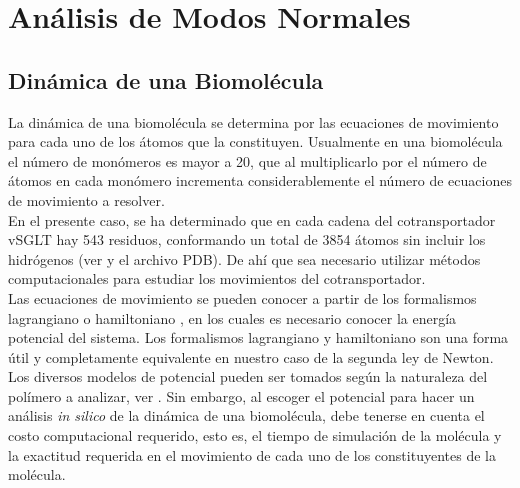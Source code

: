 \chapter{An\'{a}lisis de Modos Normales}\label{ch:Nor}

\section{Din\'{a}mica de una Biomol\'{e}cula}

La din\'{a}mica de una biomol\'{e}cula se determina por las ecuaciones de movimiento para cada uno de los \'{a}tomos que la constituyen. Usualmente en una biomol\'{e}cula el n\'{u}mero de mon\'{o}meros es mayor a 20, que al multiplicarlo por el n\'{u}mero de \'{a}tomos en cada mon\'{o}mero incrementa considerablemente el n\'{u}mero de ecuaciones de movimiento a resolver.\\

En el presente caso, se ha determinado que en cada cadena del cotransportador vSGLT hay 543 residuos, conformando un total de 3854 \'{a}tomos sin incluir los hidr\'{o}genos (ver \cite{Faham2008} y el archivo PDB). De ah\'{i} que sea necesario utilizar m\'{e}todos computacionales para estudiar los movimientos del cotransportador.\\

Las ecuaciones de movimiento se pueden conocer a partir de los formalismos lagrangiano o hamiltoniano \cite{Goldstein2001}, en los cuales es necesario conocer la  energ\'{i}a potencial del sistema. Los formalismos lagrangiano y hamiltoniano son una forma \'{u}til y completamente equivalente en nuestro caso de la segunda ley de Newton.\\

Los diversos modelos de potencial pueden ser tomados seg\'{u}n la naturaleza del pol\'{i}mero a analizar, ver \cite{Lezon2009}. Sin embargo, al escoger el potencial  para hacer un an\'{a}lisis \textit{in silico} de la din\'{a}mica de una biomol\'{e}cula, debe tenerse en cuenta el costo computacional requerido, esto es, el tiempo de simulaci\'{o}n de la mol\'{e}cula y la exactitud requerida en el movimiento de cada uno de los constituyentes de la mol\'{e}cula.\\
 
